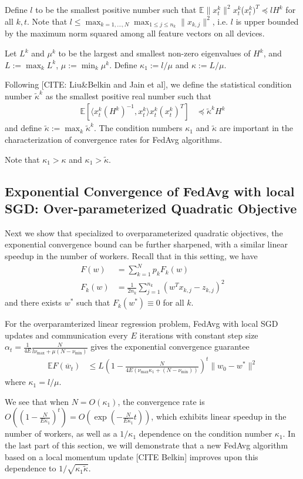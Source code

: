 Define $l$ to be the smallest positive number such that $\mathbb{E}\|x_{t}^{k}\|^{2}$$x_{t}^{k}$($x_{t}^{k})^{T}\preceq lH^{k}$
for all $k,t$. Note that $l\leq\max_{k=1,\dots,N}\max_{1\leq j\leq n_{k}}\|x_{k,j}\|^{2}$,
i.e. $l$ is upper bounded by the maximum norm squared among all feature
vectors on all devices. 

Let $L^{k}$ and $\mu^{k}$ to be the largest and smallest non-zero
eigenvalues of $H^{k}$, and $L:=\max_{k}L^{k}$, $\mu:=\min_{k}\mu^{k}$.
Define $\kappa_{1}:=l/\mu$ and $\kappa:=L/\mu$. 

Following {[}CITE: Liu\&Belkin and Jain et al{]}, we define the statistical
condition number $\tilde{\kappa}^{k}$ as the smallest positive real
number such that 
\begin{align*}
\mathbb{E}\left[\langle x_{t}^{k}(H^{k})^{-1},x_{t}^{k}\rangle x_{t}^{k}(x_{t}^{k})^{T}\right] & \preceq\tilde{\kappa}^{k}H^{k}
\end{align*}
and define $\tilde{\kappa}:=\max_{k}\tilde{\kappa}^{k}$. The condition
numbers $\kappa_{1}$ and $\tilde{\kappa}$ are important in the characterization
of convergence rates for FedAvg algorithms. 

Note that $\kappa_{1}>\kappa$ and $\kappa_{1}>\tilde{\kappa}$. 

\subsection{Exponential Convergence of FedAvg with local SGD: Over-parameterized
	Quadratic Objective}

Next we show that specialized to overparameterized quadratic objectives,
the exponential convergence bound can be further sharpened, with a
similar linear speedup in the number of workers. Recall that in this
setting, we have 
\begin{align*}
F(w) & =\sum_{k=1}^{N}p_{k}F_{k}(w)\\
F_{k}(w) & =\frac{1}{2n_{k}}\sum_{j=1}^{n_{k}}(w^{T}x_{k,j}-z_{k,j})^{2}
\end{align*}
and there exists $w^{\ast}$ such that $F_{k}(w^{\ast})\equiv0$
for all $k$. 
\begin{theorem}
	For the overparamterized linear regression problem, FedAvg with local
	SGD updates and communication every $E$ iterations with constant
	step size $\alpha_{t}=\frac{1}{4E}\frac{N}{l\nu_{\max}+\mu(N-\nu_{\min})}$
	gives the exponential convergence guarantee 
	\begin{align*}
	\mathbb{E}F(\overline{w}_{t}) & \leq L(1-\frac{N}{4E(\nu_{\max}\kappa_{1}+(N-\nu_{\min}))})^{t}\|w_{0}-w^{\ast}\|^{2}
	\end{align*}
	where $\kappa_{1}=l/\mu$. 
\end{theorem}
%
We see that when $N=O(\kappa_{1})$, the convergence rate is $O((1-\frac{N}{E\kappa_{1}})^{t})=O(\exp(-\frac{N}{E\kappa_{1}}t))$,
which exhibits linear speedup in the number of workers, as well as
a $1/\kappa_{1}$ dependence on the condition number $\kappa_{1}$.
In the last part of this section, we will demonstrate that a new FedAvg
algorithm based on a local momentum update {[}CITE Belkin{]} improves
upon this dependence to $1/\sqrt{\kappa_{1}\tilde{\kappa}}$.

